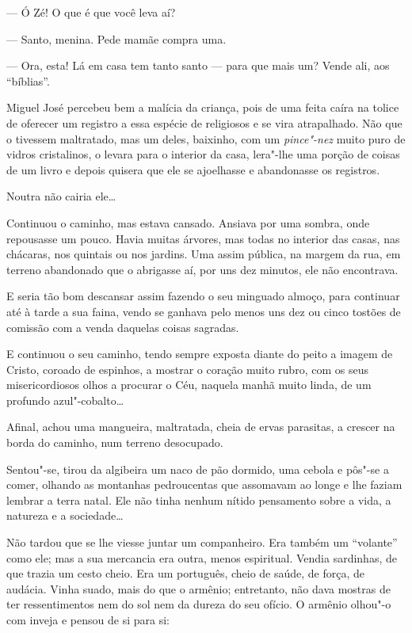 --- Ó Zé! O que é que você leva aí?

--- Santo, menina. Pede mamãe compra uma.

--- Ora, esta! Lá em casa tem tanto santo --- para que mais um? Vende
ali, aos ``bíblias''.

Miguel José percebeu bem a malícia da criança, pois de uma feita caíra
na tolice de oferecer um registro a essa espécie de religiosos e se vira
atrapalhado. Não que o tivessem maltratado, mas um deles, baixinho, com
um \emph{pince"-nez} muito puro de vidros cristalinos, o levara para o
interior da casa, lera"-lhe uma porção de coisas de um livro e depois
quisera que ele se ajoelhasse e abandonasse os registros.

Noutra não cairia ele\ldots{}

Continuou o caminho, mas estava cansado. Ansiava por uma sombra, onde
repousasse um pouco. Havia muitas árvores, mas todas no interior das
casas, nas chácaras, nos quintais ou nos jardins. Uma assim pública, na
margem da rua, em terreno abandonado que o abrigasse aí, por uns dez
minutos, ele não encontrava.

E seria tão bom descansar assim fazendo o seu minguado almoço, para
continuar até à tarde a sua faina, vendo se ganhava pelo menos uns dez
ou cinco tostões de comissão com a venda daquelas coisas sagradas.

E continuou o seu caminho, tendo sempre exposta diante do peito a imagem
de Cristo, coroado de espinhos, a mostrar o coração muito rubro, com os
seus misericordiosos olhos a procurar o Céu, naquela manhã muito linda,
de um profundo azul"-cobalto\ldots{}

Afinal, achou uma mangueira, maltratada, cheia de ervas parasitas, a
crescer na borda do caminho, num terreno desocupado.

Sentou"-se, tirou da algibeira um naco de pão dormido, uma cebola e
pôs"-se a comer, olhando as montanhas pedroucentas que assomavam ao longe
e lhe faziam lembrar a terra natal. Ele não tinha nenhum nítido
pensamento sobre a vida, a natureza e a sociedade\ldots{}

Não tardou que se lhe viesse juntar um companheiro. Era também um
``volante'' como ele; mas a sua mercancia era outra, menos espiritual.
Vendia sardinhas, de que trazia um cesto cheio. Era um português, cheio
de saúde, de força, de audácia. Vinha suado, mais do que o armênio;
entretanto, não dava mostras de ter ressentimentos nem do sol nem da
dureza do seu ofício. O armênio olhou"-o com inveja e pensou de si para
si:

